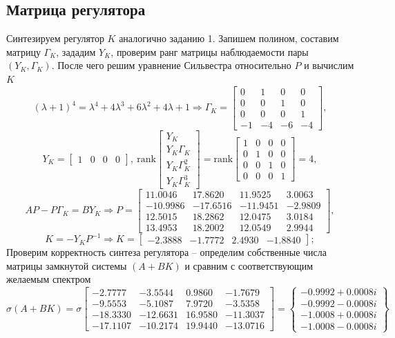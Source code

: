 \documentclass[a4paper, 12pt]{article}
\begin{document}
    \subsection{Матрица регулятора}
    Синтезируем регулятор $K$ аналогично заданию 1. Запишем полином, составим матрицу $\Gamma_K$,
    зададим $Y_K$, проверим ранг матрицы наблюдаемости пары $\left(Y_K,\Gamma_K\right)$.
    После чего решим уравнение Сильвестра относительно $P$ и вычислим $K$
    $$
    \left(\lambda+1\right)^4=\lambda^4+4\lambda^3+6\lambda^2+4\lambda+1\Rightarrow
    \Gamma_K=\begin{bmatrix}
        0 &1 &0  &0\\
        0 &0 &1 &0\\
        0 &0 &0 &1\\
        -1 &-4 &-6 &-4
    \end{bmatrix},
    $$
    $$
    Y_K=\begin{bmatrix}
        1 &0 &0 &0
    \end{bmatrix},\ \text{rank}\begin{bmatrix}
        Y_K\\ Y_K\Gamma_K\\ Y_K\Gamma_K^2\\ Y_K\Gamma_K^3
    \end{bmatrix}=\text{rank}\begin{bmatrix}
    1     &0     &0     &0\\
    0     &1     &0     &0\\
    0     &0     &1     &0\\
    0     &0     &0     &1
    \end{bmatrix}=4,
    $$
    $$
    AP-P\Gamma_K=BY_K\Rightarrow P=\begin{bmatrix}
    11.0046   &17.8620   &11.9525    &3.0063\\
    -10.9986  &-17.6516  &-11.9451   &-2.9809\\
    12.5015   &18.2862   &12.0475    &3.0184\\
    13.4953   &18.2002   &12.0549    &2.9944
    \end{bmatrix},
    $$
    $$
    K=-Y_KP^{-1}\Rightarrow K=\begin{bmatrix}
        -2.3888   &-1.7772    &2.4930   &-1.8840
    \end{bmatrix};
    $$
    Проверим корректность синтеза регулятора -- определим собственные числа
    матрицы замкнутой системы $\left(A+BK\right)$ и сравним с соответствующим
    желаемым спектром
    $$
    \sigma\left(A+BK\right)=\sigma\begin{bmatrix}
    -2.7777   &-3.5544    &0.9860   &-1.7679\\
   -9.5553   &-5.1087    &7.9720   &-3.5358\\
  -18.3330  &-12.6631   &16.9580  &-11.3037\\
  -17.1107  &-10.2174   &19.9440  &-13.0716
    \end{bmatrix}=\left\{\begin{matrix}
    -0.9992 + 0.0008i\\
  -0.9992 - 0.0008i\\
  -1.0008 + 0.0008i\\
  -1.0008 - 0.0008i
    \end{matrix}\right\}
    $$
\end{document}
